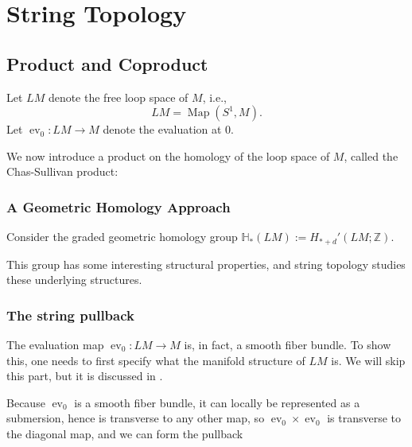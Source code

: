 \documentclass[reqno]{amsart}
\theoremstyle{definition}
\theoremstyle{remark}
\DeclareMathOperator{\Map}{Map}
\DeclareMathOperator{\ev}{ev}
\begin{document}
\newpage

\section{String Topology}














\subsection{Product and Coproduct}

Let $LM$ denote the free loop space of
$M$, i.e.,
\[
LM = \Map \left( S^{1}, M \right).
\] 
Let $\ev_0 \colon LM \to M$ denote the evaluation at $0$.

We now introduce a product on the homology of the loop space of $M$, called
the Chas-Sullivan product:

\subsubsection{A Geometric Homology Approach}

Consider the graded geometric homology group
$\mathbb{H}_* \left( LM \right) :=
H_{*+d}'\left( LM;\mathbb{Z} \right) $.

This group has some interesting structural properties, and string
topology studies these underlying structures.

\subsubsection{The string pullback}

The evaluation map $\ev_0 \colon LM \to M$ is, in fact, a smooth
fiber bundle.
To show this, one needs to first specify what the manifold
structure of $LM$ is. We will skip this part, but
it is discussed in \cite[§2.3.2]{Chataur}.


Because $\ev_0$ is a smooth fiber bundle,
it can locally be represented as a submersion, hence
is transverse to any other map, so
$\ev_0 \times \ev_0$ is transverse to the diagonal map,
and we can form the pullback 
\end{document}
